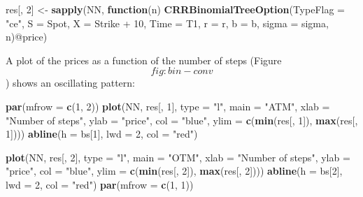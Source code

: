 \documentclass[justified]{tufte-book}
\newenvironment{Shaded}{}{}
\newcommand{\ControlFlowTok}[1]{\textcolor[rgb]{0.00,0.44,0.13}{\textbf{#1}}}
\newcommand{\DataTypeTok}[1]{\textcolor[rgb]{0.56,0.13,0.00}{#1}}
\newcommand{\DecValTok}[1]{\textcolor[rgb]{0.25,0.63,0.44}{#1}}
\newcommand{\KeywordTok}[1]{\textcolor[rgb]{0.00,0.44,0.13}{\textbf{#1}}}
\newcommand{\NormalTok}[1]{#1}
\newcommand{\OperatorTok}[1]{\textcolor[rgb]{0.40,0.40,0.40}{#1}}
\newcommand{\StringTok}[1]{\textcolor[rgb]{0.25,0.44,0.63}{#1}}
\begin{document}
\begin{Shaded}
\begin{Highlighting}[]
\NormalTok{res[, }\DecValTok{2}\NormalTok{] \textless{}{-}}\StringTok{ }\KeywordTok{sapply}\NormalTok{(NN, }\ControlFlowTok{function}\NormalTok{(n) }\KeywordTok{CRRBinomialTreeOption}\NormalTok{(}\DataTypeTok{TypeFlag =} \StringTok{"ce"}\NormalTok{,}
    \DataTypeTok{S =}\NormalTok{ Spot, }\DataTypeTok{X =}\NormalTok{ Strike }\OperatorTok{+}\StringTok{ }\DecValTok{10}\NormalTok{, }\DataTypeTok{Time =}\NormalTok{ T1, }\DataTypeTok{r =}\NormalTok{ r,}
    \DataTypeTok{b =}\NormalTok{ b, }\DataTypeTok{sigma =}\NormalTok{ sigma, n)}\OperatorTok{@}\NormalTok{price)}
\end{Highlighting}
\end{Shaded}

A plot of the prices as a function of the number of steps
(Figure~\[fig:bin-conv\]) shows an oscillating pattern:

\begin{Shaded}
\begin{Highlighting}[]
\KeywordTok{par}\NormalTok{(}\DataTypeTok{mfrow =} \KeywordTok{c}\NormalTok{(}\DecValTok{1}\NormalTok{, }\DecValTok{2}\NormalTok{))}
\KeywordTok{plot}\NormalTok{(NN, res[, }\DecValTok{1}\NormalTok{], }\DataTypeTok{type =} \StringTok{"l"}\NormalTok{, }\DataTypeTok{main =} \StringTok{"ATM"}\NormalTok{, }\DataTypeTok{xlab =} \StringTok{"Number of steps"}\NormalTok{,}
    \DataTypeTok{ylab =} \StringTok{"price"}\NormalTok{, }\DataTypeTok{col =} \StringTok{"blue"}\NormalTok{, }\DataTypeTok{ylim =} \KeywordTok{c}\NormalTok{(}\KeywordTok{min}\NormalTok{(res[,}
        \DecValTok{1}\NormalTok{]), }\KeywordTok{max}\NormalTok{(res[, }\DecValTok{1}\NormalTok{])))}
\KeywordTok{abline}\NormalTok{(}\DataTypeTok{h =}\NormalTok{ bs[}\DecValTok{1}\NormalTok{], }\DataTypeTok{lwd =} \DecValTok{2}\NormalTok{, }\DataTypeTok{col =} \StringTok{"red"}\NormalTok{)}

\KeywordTok{plot}\NormalTok{(NN, res[, }\DecValTok{2}\NormalTok{], }\DataTypeTok{type =} \StringTok{"l"}\NormalTok{, }\DataTypeTok{main =} \StringTok{"OTM"}\NormalTok{, }\DataTypeTok{xlab =} \StringTok{"Number of steps"}\NormalTok{,}
    \DataTypeTok{ylab =} \StringTok{"price"}\NormalTok{, }\DataTypeTok{col =} \StringTok{"blue"}\NormalTok{, }\DataTypeTok{ylim =} \KeywordTok{c}\NormalTok{(}\KeywordTok{min}\NormalTok{(res[,}
        \DecValTok{2}\NormalTok{]), }\KeywordTok{max}\NormalTok{(res[, }\DecValTok{2}\NormalTok{])))}
\KeywordTok{abline}\NormalTok{(}\DataTypeTok{h =}\NormalTok{ bs[}\DecValTok{2}\NormalTok{], }\DataTypeTok{lwd =} \DecValTok{2}\NormalTok{, }\DataTypeTok{col =} \StringTok{"red"}\NormalTok{)}
\KeywordTok{par}\NormalTok{(}\DataTypeTok{mfrow =} \KeywordTok{c}\NormalTok{(}\DecValTok{1}\NormalTok{, }\DecValTok{1}\NormalTok{))}
\end{Highlighting}
\end{Shaded}
\end{document}
